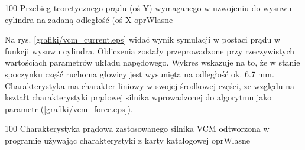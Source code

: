 	{100}
	{Przebieg teoretycznego prądu (oś Y) wymaganego w uzwojeniu do wysuwu cylindra na zadaną odległość (oś X}
	{oprWlasne}
	
Na rys. \ref{grafiki/vcm_current.eps} widać wynik symulacji w postaci prądu w funkcji wysuwu cylindra. Obliczenia zostały przeprowadzone przy rzeczywistych wartościach parametrów układu napędowego. Wykres wskazuje na to, że w stanie spoczynku część ruchoma głowicy jest wysunięta na odległość ok. 6.7 mm. Charakterystyka ma charakter liniowy w swojej środkowej części, ze względu na kształt charakterystyki prądowej silnika wprowadzonej do algorytmu jako parametr (\ref{grafiki/vcm_force.eps}).

	{100}
	{Charakterystyka prądowa zastosowanego silnika VCM odtworzona w programie używając charakterystyki z karty katalogowej}
	{oprWlasne}




















\clearpage
